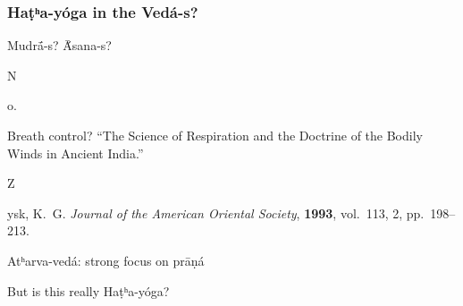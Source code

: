 \documentclass[pdf]{beamer}
\newcommand{\Subitem}[1]{{\setlength\itemindent{12pt} \item[-] #1}}
\begin{document}
\begin{frame} \frametitle{Haṭʰa-yóga in the Vedá-s?}
\begin{itemize}
	\item Mudrā́-s? Ā́sana-s?
	\Subitem No.
	\item Breath control? ``The Science of Respiration and the Doctrine of the Bodily Winds in Ancient India.''
	\Subitem Zysk, K.~G. \emph{Journal of the American Oriental Society}, \textbf{1993}, vol.~113, 2, pp.~198--213.
	\item Atʰarva-vedá: strong focus on prāṇá
	\item But is this really Haṭʰa-yóga?
\end{itemize}
\end{frame}

\end{document}
